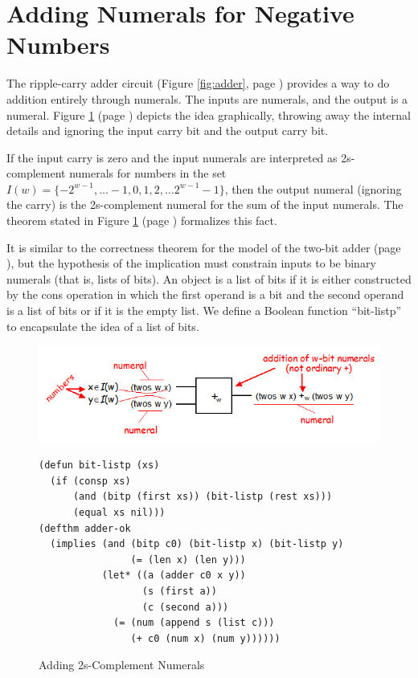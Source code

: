 \section{Adding Numerals for Negative Numbers}
\label{sec:adding-negative-numerals}

The ripple-carry adder circuit
(Figure \ref{fig:adder}, page \pageref{fig:adder})
provides a way to do addition entirely through numerals.
The inputs are numerals, and the output is a numeral.
Figure \ref{fig:adder-schematic} (page \pageref{fig:adder-schematic})
depicts the idea graphically,
throwing away the internal details
and ignoring the input carry bit and the output carry bit.

If the input carry is zero and
the input numerals are interpreted
as 2s-complement numerals for numbers in the set
$I(w) = \{-2^{w-1}, \dots -1, 0, 1, 2, \dots 2^{w-1}-1\}$,
then the output numeral (ignoring the carry) is the 2s-complement numeral
for the sum of the input numerals.
The theorem stated in
Figure \ref{fig:adder-schematic} (page \pageref{fig:adder-schematic})
formalizes this fact.

It is similar to the correctness theorem for the
model of the two-bit adder (page \pageref{adder2-ok}),
but the hypothesis of the implication must constrain
inputs to be binary numerals (that is, lists of bits).
An object is a list of bits if it is either
constructed by the cons operation in which the
first operand is a bit and the second operand
is a list of bits or if it is the empty list.
We define a Boolean function ``bit-listp'' to
encapsulate the idea of a list of bits.

\begin{figure}
\begin{center}
\includegraphics[scale=0.8]{Images/adder-schematic.png}
\begin{lstlisting}
(defun bit-listp (xs)
  (if (consp xs)
      (and (bitp (first xs)) (bit-listp (rest xs)))
      (equal xs nil)))
(defthm adder-ok
  (implies (and (bitp c0) (bit-listp x) (bit-listp y)
                (= (len x) (len y)))
           (let* ((a (adder c0 x y))
                  (s (first a))
                  (c (second a)))
             (= (num (append s (list c)))
                (+ c0 (num x) (num y))))))
\end{lstlisting}
\end{center}
\caption{Adding 2s-Complement Numerals}
\label{fig:adder-schematic}
\end{figure}

